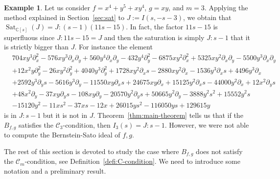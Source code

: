 \documentclass[a4paper,12pt]{amsart}
\theoremstyle{plain}
\theoremstyle{definition}
\newtheorem{ex}[theorem]{Example}
\theoremstyle{remark}
\def\CC{\mathbb{C}}
\DeclareMathOperator{\Sat}{Sat}
\begin{document}
\begin{ex}\label{ex:Reiffen-xy-m3}
Let us consider $f = x^4 + y^5 + xy^4$, $g = xy$, and $m=3$.
Applying the method explained in Section~\ref{sec:sat} to $J := I(s,-s-3)$,
we obtain that $\Sat_{\CC[s]}(J) = J:(s-1)(11s-15)$. In fact, the factor $11s-15$
is superfluous since $J:11s-15 = J$ and then the saturation is simply $J:s-1$
that it is strictly bigger than $J$. For instance the element
\[
\begin{aligned}
& 704xy^3 \partial_x^2 - 576xy^3\partial_x \partial_y + 560y^4 \partial_x \partial_y - 432y^4 \partial_y^2 - 6875xy^2 \partial_x^2 + 5325xy^2 \partial_x \partial_y - 5500y^3\partial_x \partial_y \\
& + 12x^2y \partial_y^2 - 26xy^2\partial_y^2 + 4040y^3\partial_y^2 + 1728xy^2\partial_xs - 2880xy^2\partial_x - 1536y^3\partial_x s + 4496y^3\partial_x \\
& + 2592y^3\partial_y s - 5616y^3\partial_y - 11550xy\partial_x s + 24675xy\partial_x + 15125y^2\partial_x s - 44000y^2\partial_x + 12x^2\partial_y s \\
& + 48x^2\partial_y - 37xy\partial_y s - 108xy\partial_y - 20570y^2\partial_y s + 50665 y^2\partial_y - 3888y^2 s^2 + 15552y^2 s \\
& - 15120y^2 - 11xs^2 - 37xs - 12x + 26015ys^2 - 116050ys + 129615y
\end{aligned}
\]
is in $J:s-1$ but it is not in $J$. Theorem~\ref{thm:main-theorem} tells us that if the $B_{f,g}$ satisfies
the $\mathcal{C}_3$-condition, then $I_3(s) = J:s-1$. However, we were not able to compute the Bernstein-Sato
ideal of $f,g$.
\end{ex}

The rest of this section is devoted to study the case where $B_{f,g}$ does not satisfy the $\mathcal{C}_m$-condition,
see Definition~\ref{defi:C-condition}. We need to introduce some notation and a preliminary result.
\end{document}
